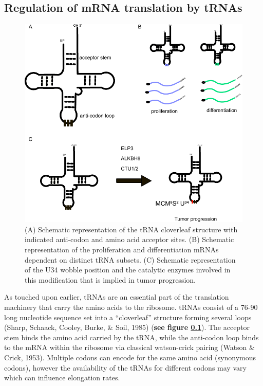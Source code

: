 \documentclass[
  12pt,
  openany]{book}
\begin{document}
\subsection{Regulation of mRNA translation by tRNAs} \label{tRNA}
\begin{figure}
  \includegraphics{./figures/tRNA.pdf}
  \caption{ (A) Schematic representation of the tRNA cloverleaf structure with indicated anti-codon and amino acid acceptor sites.  (B) Schematic representation of the proliferation and differentiation mRNAs dependent on distinct tRNA subsets. (C) Schematic representation of the U34 wobble position and the catalytic enzymes involved in this modification that is implied in tumor progression.
 \label{fig:tRNA}}
\end{figure}

As touched upon earlier, tRNAs are an essential part of the translation machinery that carry the amino acids to the ribosome. tRNAs consist of a 76-90 long nucleotide sequence set into a ``cloverleaf'' structure forming several loops (Sharp, Schaack, Cooley, Burke, \& Soil, 1985) (\textbf{see figure \ref{tRNA}}). The acceptor stem binds the amino acid carried by the tRNA, while the anti-codon loop binds to the mRNA within the ribosome via classical watson-crick pairing (Watson \& Crick, 1953). Multiple codons can encode for the same amino acid (synonymous codons), however the availability of the tRNAs for different codons may vary which can influence elongation rates.
\end{document}
